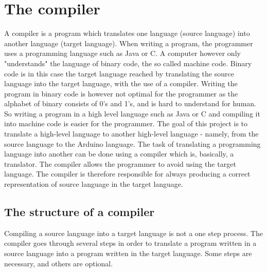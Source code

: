 \chapter{The compiler} \label{chap:the_compiler}
A compiler is a program which translates one language (source language) into another language (target language). When writing a program, the programmer uses a programming language such as Java or C. A computer however only "understands" the language of binary code, the so called machine code. Binary code is in this case the target language reached by translating the source language into the target language, with the use of a compiler. Writing the program in binary code is however not optimal for the programmer as the alphabet of binary consists of 0's and 1's, and is hard to understand for human. So writing a program in a high level language such as Java or C and compiling it into machine code is easier for the programmer.
The goal of this project is to translate a high-level language to another high-level language - namely, from the source language to the Arduino language. The task of translating a programming language into another can be done using a compiler which is, basically, a translator. The compiler allows the programmer to avoid using the target language. The compiler is therefore responsible for always producing a correct representation of source language in the target language.

\section{The structure of a compiler} 
\label{sec:compiler}
Compiling a source language into a target language is not a one step process. The compiler goes through several steps in order to translate a program written in a source language into a program written in the target language. Some steps are necessary, and others are optional.

